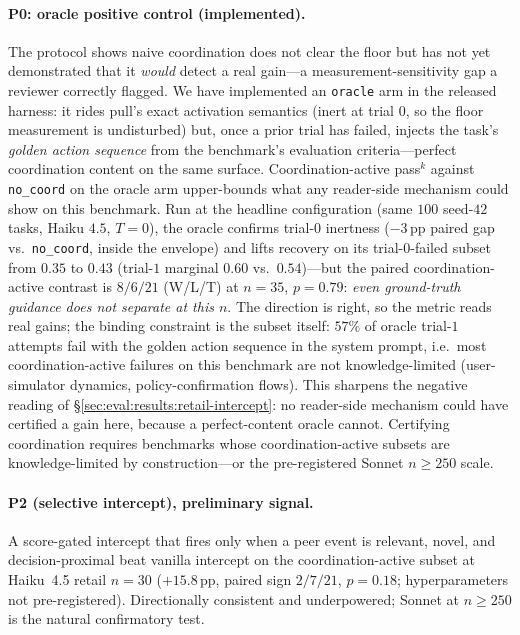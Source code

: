 \paragraph{P0: oracle positive control (implemented).}
The protocol shows naive coordination does not clear the floor
but has not yet demonstrated that it \emph{would} detect a real
gain---a measurement-sensitivity gap a reviewer correctly
flagged. We have implemented an \texttt{oracle} arm in the
released harness: it rides pull's exact activation semantics
(inert at trial $0$, so the floor measurement is undisturbed)
but, once a prior trial has failed, injects the task's
\emph{golden action sequence} from the benchmark's evaluation
criteria---perfect coordination content on the same surface.
Coordination-active pass$^k$ against \texttt{no\_coord} on the
oracle arm upper-bounds what any reader-side mechanism could
show on this benchmark. Run at the headline configuration (same
$100$ seed-$42$ tasks, Haiku $4.5$, $T{=}0$), the oracle
confirms trial-$0$ inertness ($-3$\,pp paired gap vs.\
\texttt{no\_coord}, inside the envelope) and lifts recovery on
its trial-$0$-failed subset from $0.35$ to $0.43$
(trial-$1$ marginal $0.60$ vs.\ $0.54$)---but the paired
coordination-active contrast is $8/6/21$ (W/L/T) at $n{=}35$,
$p{=}0.79$: \emph{even ground-truth guidance does not separate
at this $n$}. The direction is right, so the metric reads
real gains; the binding constraint is the subset itself:
$57\%$ of oracle trial-$1$ attempts fail with the golden action
sequence in the system prompt, i.e.\ most coordination-active
failures on this benchmark are not knowledge-limited
(user-simulator dynamics, policy-confirmation flows). This
sharpens the negative reading of
\S\ref{sec:eval:results:retail-intercept}: no reader-side
mechanism could have certified a gain here, because a
perfect-content oracle cannot. Certifying coordination requires
benchmarks whose coordination-active subsets are
knowledge-limited by construction---or the pre-registered
Sonnet $n{\geq}250$ scale.

\paragraph{P2 (selective intercept), preliminary signal.}
A score-gated intercept that fires only when a peer event is
relevant, novel, and decision-proximal beat vanilla intercept on
the coordination-active subset at Haiku~4.5 retail $n{=}30$
($+15.8$\,pp, paired sign $2/7/21$, $p{=}0.18$; hyperparameters
not pre-registered). Directionally consistent and underpowered;
Sonnet at $n{\geq}250$ is the natural confirmatory test.
